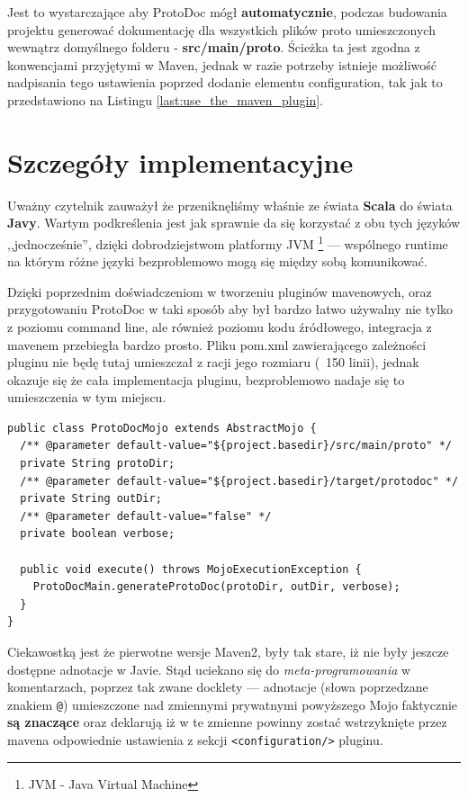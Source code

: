 \documentclass[pdflatex,11pt]{aghdpl}
\begin{document}
Jest to wystarczające aby ProtoDoc mógł \textbf{automatycznie}, podczas budowania projektu generować dokumentację
dla wszystkich plików proto umieszczonych wewnątrz domyślnego folderu - \textbf{src/main/proto}. Ścieżka ta jest zgodna z konwencjami przyjętymi
w Maven, jednak w razie potrzeby istnieje możliwość nadpisania tego ustawienia poprzed dodanie elementu configuration, tak jak to przedstawiono na Listingu \ref{last:use_the_maven_plugin}.

\section{Szczegóły implementacyjne}
\label{maven_implementacja}
Uważny czytelnik zauważył że przeniknęliśmy właśnie ze świata \textbf{Scala} do świata \textbf{Javy}.
Wartym podkreślenia jest jak sprawnie da się korzystać z obu tych języków ,,jednocześnie'', 
dzięki dobrodziejstwom platformy JVM \footnote{JVM - Java Virtual Machine} --- wspólnego runtime na którym różne języki bezproblemowo mogą 
się między sobą komunikować.

Dzięki poprzednim doświadczeniom w tworzeniu pluginów mavenowych, oraz przygotowaniu ProtoDoc w taki sposób aby był bardzo łatwo używalny nie tylko z poziomu
command line, ale również poziomu kodu źródłowego, integracja z mavenem przebiegła bardzo prosto. Pliku pom.xml zawierającego zależności pluginu nie będę 
tutaj umieszczał z racji jego rozmiaru (~150 linii), jednak okazuje się że cała implementacja pluginu, bezproblemowo nadaje się to umieszczenia w tym miejscu.

\begin{lstlisting}[caption={Pełna implementacja pluginu mavenowego korzystającego z ProtoDoc}]
public class ProtoDocMojo extends AbstractMojo {
  /** @parameter default-value="${project.basedir}/src/main/proto" */
  private String protoDir;
  /** @parameter default-value="${project.basedir}/target/protodoc" */
  private String outDir;
  /** @parameter default-value="false" */
  private boolean verbose;

  public void execute() throws MojoExecutionException {
    ProtoDocMain.generateProtoDoc(protoDir, outDir, verbose);
  }
}
\end{lstlisting}

Ciekawostką jest że pierwotne wersje Maven2, były tak stare, iż nie były jeszcze dostępne adnotacje w Javie. 
Stąd uciekano się do \textit{meta-programowania} w komentarzach, poprzez tak zwane docklety --- adnotacje (słowa poprzedzane znakiem \verb|@|)
umieszczone nad zmiennymi prywatnymi powyższego Mojo faktycznie \textbf{są znaczące} oraz deklarują iż w te zmienne powinny zostać wstrzyknięte
przez mavena odpowiednie ustawienia z sekcji \verb|<configuration/>| pluginu.
\end{document}
